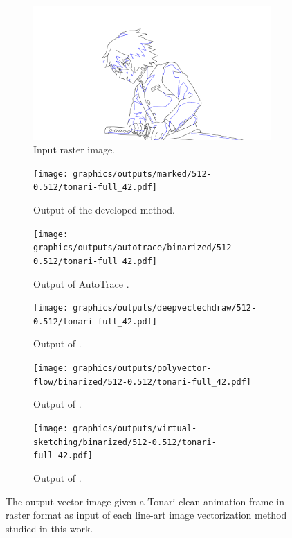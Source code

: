\begin{figure}[h]
    \centering
    \begin{subfigure}{.49\textwidth}
    \includegraphics[width=\textwidth]{graphics/outputs/tonari-full_42.png}
    \caption{Input raster image.}
    \end{subfigure}
    \begin{subfigure}{.49\textwidth}
    \texttt{[image: graphics/outputs/marked/512-0.512/tonari-full\_42.pdf]}
    \caption{Output of the developed method.}
    \end{subfigure}
    \begin{subfigure}{.49\textwidth}
    \texttt{[image: graphics/outputs/autotrace/binarized/512-0.512/tonari-full\_42.pdf]}
    \caption{Output of AutoTrace \citep{autotrace}.}
    \end{subfigure}
    \begin{subfigure}{.49\textwidth}
    \texttt{[image: graphics/outputs/deepvectechdraw/512-0.512/tonari-full\_42.pdf]}
    \caption{Output of \citet{DBLP:conf/eccv/EgiazarianVAVST20}.}
    \end{subfigure}
    \begin{subfigure}{.49\textwidth}
    \texttt{[image: graphics/outputs/polyvector-flow/binarized/512-0.512/tonari-full\_42.pdf]}
    \caption{Output of \citet{Puhachov2021KeypointPolyvector}.}
    \end{subfigure}
    \begin{subfigure}{.49\textwidth}
    \texttt{[image: graphics/outputs/virtual-sketching/binarized/512-0.512/tonari-full\_42.pdf]}
    \caption{Output of \citet{mo2021virtualsketching}.}
    \end{subfigure}
    \caption{The output vector image given a Tonari clean animation frame in raster format as input of each line-art image vectorization method studied in this work.}
    \label{fig:tonari-full_42_full_comparison}
\end{figure}

